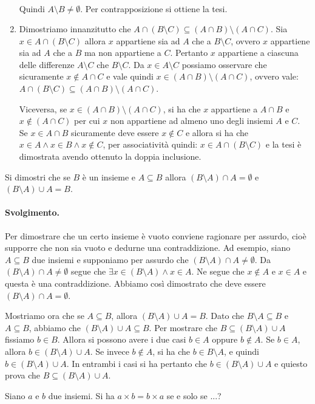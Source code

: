 \begin{enumerate}
\begin{align*}
	\end{align*}
	Quindi $A \setminus B \neq \emptyset$. Per contrapposizione si ottiene la tesi.
	\item Dimostriamo innanzitutto che $A \cap (B \setminus C) \subseteq (A \cap B) \setminus (A \cap C)$. Sia $x \in A \cap (B \setminus C)$ allora $x$ appartiene sia ad $A$ che a $B \setminus C$, ovvero $x$ appartiene sia ad $A$ che a $B$ ma non appartiene a $C$. Pertanto $x$ appartiene a ciascuna delle differenze $A \setminus C$ che $B \setminus C$. Da $x \in A \setminus C$ possiamo osservare che sicuramente $x \notin A \cap C$ e vale quindi $x \in (A \cap B) \setminus (A \cap C)$, ovvero vale: $A \cap (B \setminus C) \subseteq (A \cap B) \setminus (A \cap C)$.
	
	Viceversa, se $x \in (A \cap B) \setminus (A \cap C)$, si ha che $x$ appartiene a $A \cap B$ e $x \notin (A \cap C)$ per cui $x$ non appartiene ad almeno uno degli insiemi $A$ e $C$. Se $x \in A \cap B$ sicuramente deve essere $x \notin C$ e allora si ha che $x \in A \land x \in B \land x \notin C$, per associatività quindi: $x \in A \cap (B \setminus C)$ e la tesi è dimostrata avendo ottenuto la doppia inclusione. \hfill \blacksquare
\end{enumerate}
\begin{exsbox}
	Si dimostri che se $B$ è un insieme e $A \subseteq B$ allora $(B \setminus A) \cap A = \emptyset $ e $(B \setminus A) \cup A = B$.
\end{exsbox}
\paragraph{Svolgimento.} Per dimostrare che un certo insieme è vuoto conviene ragionare per assurdo, cioè supporre che non sia vuoto e dedurne una contraddizione. Ad esempio, siano $A \subseteq B$ due insiemi e supponiamo per assurdo che $(B \setminus A) \cap A \neq \emptyset$. Da $(B \setminus A) \cap A \neq \emptyset$ segue che $\exists x \in (B \setminus A) \land x \in A$. Ne segue che $x \notin A$ e $x \in A$ e questa è una contraddizione. Abbiamo così dimostrato che deve essere $(B \setminus A) \cap A = \emptyset$.

Mostriamo ora che se $A \subseteq B$, allora $(B \setminus A) \cup A = B$. Dato che $B \setminus A \subseteq B$ e $A \subseteq B$, abbiamo che $(B \setminus A) \cup A  \subseteq B$. Per mostrare che $B \subseteq (B \setminus A) \cup A$ fissiamo $b \in B$. Allora si possono avere i due casi $b \in A$ oppure $b \notin A$. Se $b \in A$, allora $b \in (B \setminus A) \cup A$. Se invece $b \notin A$, si ha che $b \in B \setminus A$, e quindi $b \in (B \setminus A) \cup A$. In entrambi i casi si ha pertanto che $b \in (B \setminus A) \cup A$ e quiesto prova che $B \subseteq (B \setminus A) \cup A$. \hfill \blacksquare
\begin{exsbox}
	Siano $a$ e $b$ due insiemi. Si ha $a \times b = b \times a$ se e solo se ...?
\end{exsbox}
